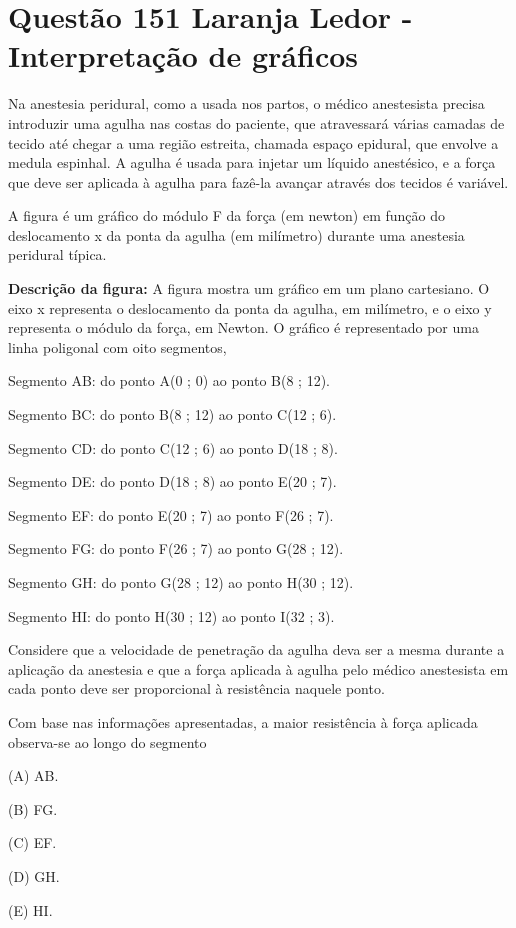 \section{Questão 151 Laranja Ledor - Interpretação de gráficos}

Na anestesia peridural, como a usada nos partos, o médico anestesista precisa introduzir uma agulha nas costas do paciente, que atravessará várias camadas de tecido até chegar a uma região estreita, chamada espaço epidural, que envolve a medula espinhal. A agulha é usada para injetar um líquido anestésico, e a força que deve ser aplicada à agulha para fazê-la  avançar através dos tecidos é variável.

A figura é um gráfico do módulo F da força (em newton) em função do deslocamento x da ponta da agulha (em milímetro) durante uma anestesia peridural típica. 

\textbf{Descrição da figura:} A figura mostra um gráfico em um plano cartesiano. O eixo x representa o deslocamento da ponta da agulha, em milímetro, e o eixo y representa o módulo da força, em Newton. O gráfico é representado por uma linha poligonal com oito segmentos,

Segmento AB: do ponto A(0 ; 0) ao ponto B(8 ; 12).

Segmento BC: do ponto B(8 ; 12) ao ponto C(12 ; 6).

Segmento CD: do ponto C(12 ; 6) ao ponto D(18 ; 8).

Segmento DE: do ponto D(18 ; 8) ao ponto E(20 ; 7).

Segmento EF: do ponto E(20 ; 7) ao ponto F(26 ; 7).

Segmento FG: do ponto F(26 ; 7) ao ponto G(28 ; 12).

Segmento GH: do ponto G(28 ; 12) ao ponto H(30 ; 12).

Segmento HI: do ponto H(30 ; 12) ao ponto I(32 ; 3).


Considere que a velocidade de penetração da agulha deva ser a mesma durante a aplicação da anestesia e que a força aplicada à agulha pelo médico anestesista em cada ponto deve ser proporcional à resistência naquele ponto.

Com base nas informações apresentadas, a maior resistência à força aplicada observa-se ao longo do segmento

(A) AB.

(B) FG.

(C) EF.

(D) GH.

(E) HI.


